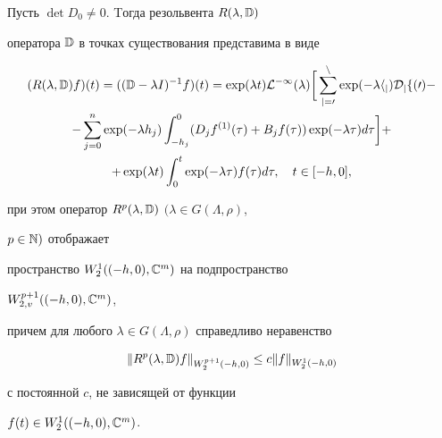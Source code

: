 \begin{lem} 


Пусть $\det D_0\ne0$. Tогда резольвента $R(\lambda,\Bbb D)$ 


оператора $\Bbb D$ в точках существования представима в виде


\begin{multline} 


(R(\lambda,\Bbb D)f)(t)=((\Bbb D-\lambda I)^{-1}f)(t)= 


\exp(\lambda t)\cal L^{-1}(\lambda)\bigg[\sum^n_{j=0} 


\exp(-\lambda h_j)D_j f(0)- \\ 


% 


-\sum^n_{j=0}\exp(-\lambda h_j)\int^0_{-h_j} 


(D_j f^{(1)}(\tau)+B_j f(\tau))\exp(-\lambda\tau)d\tau\bigg]+ \\ 


% 


+\exp(\lambda t)\int^t_0\exp(-\lambda\tau)f(\tau)d\tau, 


\quad t\in[-h,0], 


\end{multline} 


при этом оператор $R^p(\lambda,\Bbb D)$ $(\lambda\in G(\Lambda,\rho)$, 


$p\in\Bbb N)$ отображает 


пространство $W^1_2((-h,0),\Bbb C^m)$ на подпространство 


$W^{p+1}_{2,v}((-h,0),\Bbb C^m)$, 


причем для любого $\lambda\in G(\Lambda,\rho)$ справедливо неравенство 


\begin{equation} 


\|R^p(\lambda,\Bbb D)f\|_{W^{p+1}_2(-h,0)}\le 


c\|f\|_{W^1_2(-h,0)} 


\end{equation} 


с постоянной $c$, не зависящей от функции 


$f(t)\in W^1_2((-h,0),\Bbb C^m)$. 


\end{lem} 


 


